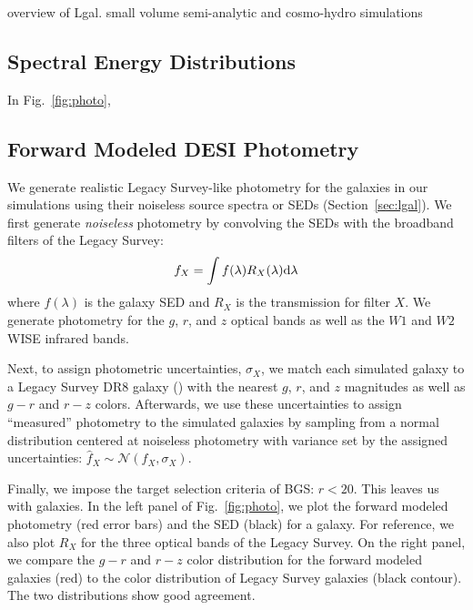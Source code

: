overview of Lgal. small volume semi-analytic and cosmo-hydro simulations


\subsection{Spectral Energy Distributions} \label{sec:sed}
In Fig.~\ref{fig:photo}, 

\subsection{Forward Modeled DESI Photometry} \label{sec:photo} 
We generate realistic Legacy Survey-like photometry for the galaxies in our
simulations using their noiseless source spectra or SEDs
(Section~\ref{sec:lgal}). We first generate {\em noiseless} photometry by
convolving the SEDs with the broadband filters of the Legacy Survey: 
\begin{equation}
     f_X = \int f(\lambda) R_X(\lambda) {\rm d}\lambda
\end{equation}
where $f(\lambda)$ is the galaxy SED and $R_X$ is the transmission for filter
$X$. We generate photometry for the $g$, $r$, and $z$ optical bands as well as
the $W1$ and $W2$ WISE infrared bands.

Next, to assign photometric uncertainties, $\sigma_X$, we match each simulated galaxy
to a Legacy Survey DR8 galaxy 
()
with the nearest $g$, $r$, and $z$ magnitudes as well as $g - r$ and $r - z$
colors. Afterwards, we use these uncertainties to assign ``measured''
photometry to the simulated galaxies by
sampling from a normal distribution centered at noiseless photometry with
variance set by the assigned uncertainties: $\hat{f}_X \sim \mathcal{N}(f_X,
\sigma_X)$. 

Finally, we impose the target selection criteria of BGS: $r < 20$. 
This leaves us with  \lgal galaxies. 
In the left panel of Fig.~\ref{fig:photo}, we plot the forward
modeled photometry (red error bars) and the SED (black) for a \lgal galaxy. 
For reference, we also plot $R_X$ for the three optical bands of the Legacy
Survey. On the right panel, we compare the $g - r$ and $r - z$ color
distribution for the forward modeled \lgal galaxies (red) to the color
distribution of Legacy Survey galaxies (black contour). The two distributions
show good agreement.  

